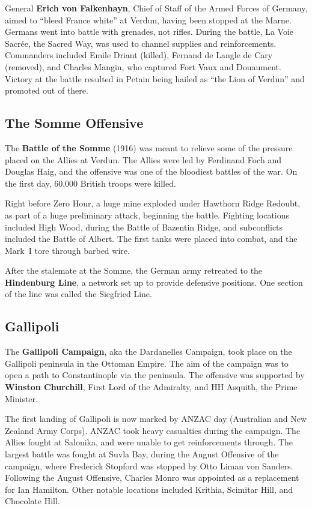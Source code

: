 General \textbf{Erich von Falkenhayn}, Chief of Staff of the Armed Forces of Germany,
aimed to ``bleed France white'' at Verdun, having been stopped at the Marne.
Germans went into battle with grenades, not rifles.
During the battle, La Voie Sacr\'ee, the Sacred Way, was used to channel supplies and reinforcements.
Commanders included Emile Driant (killed), Fernand de Langle de Cary (removed),
and Charles Mangin, who captured Fort Vaux and Douaument.
Victory at the battle resulted in Petain being hailed as ``the Lion of Verdun'' and promoted out of there.

\subsection*{The Somme Offensive}

The \textbf{Battle of the Somme} (1916) was meant to relieve some of the pressure placed on the Allies at Verdun.
The Allies were led by Ferdinand Foch and Douglas Haig,
and the offensive was one of the bloodiest battles of the war.
On the first day, 60,000 British troops were killed.

Right before Zero Hour, a huge mine exploded under Hawthorn Ridge Redoubt,
as part of a huge preliminary attack, beginning the battle.
Fighting locations included High Wood, during the Battle of Bazentin Ridge,
and subconflicts included the Battle of Albert.
The first tanks were placed into combat, and the Mark~I tore through barbed wire.

After the stalemate at the Somme, the German army retreated to the \textbf{Hindenburg Line},
a network set up to provide defensive positions.
One section of the line was called the Siegfried Line.

\subsection*{Gallipoli}

The \textbf{Gallipoli Campaign}, aka the Dardanelles Campaign,
took place on the Gallipoli peninsula in the Ottoman Empire.
The aim of the campaign was to open a path to Constantinople via the peninsula.
The offensive was supported by \textbf{Winston Churchill}, First Lord of the Admiralty,
and HH Asquith, the Prime Minister.

The first landing of Gallipoli is now marked by ANZAC day (Australian and New Zealand Army Corps).
ANZAC took heavy casualties during the campaign.
The Allies fought at Salonika, and were unable to get reinforcements through.
The largest battle was fought at Suvla Bay, during the August Offensive of the campaign,
where Frederick Stopford was stopped by Otto Liman von Sanders.
Following the August Offensive, Charles Monro was appointed as a replacement for Ian Hamilton.
Other notable locations included Krithia, Scimitar Hill, and Chocolate Hill.

